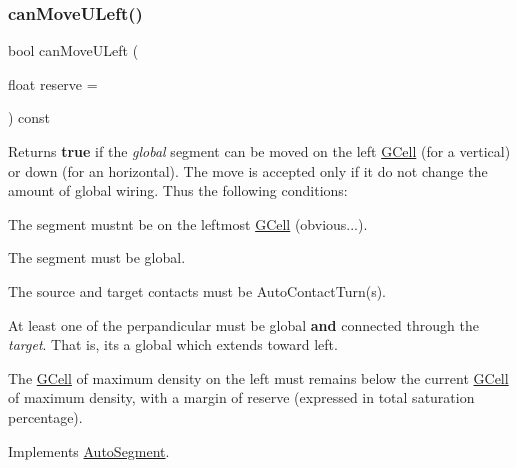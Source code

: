 \mbox{\label{classKatabatic_1_1AutoVertical_a9b0c21eeb26c256876592ba63438da74}} 
\subsubsection{\texorpdfstring{can\+Move\+U\+Left()}{canMoveULeft()}}
{\footnotesize\ttfamily bool can\+Move\+U\+Left (\begin{DoxyParamCaption}\item[{float}]{reserve = {} }\end{DoxyParamCaption}) const\hspace{0.3cm}{\ttfamily [virtual]}}

\begin{DoxyReturn}{Returns}
{\bfseries true} if the {\itshape global} segment can be moved on the left \hyperlink{classKatabatic_1_1GCell}{G\+Cell} (for a vertical) or down (for an horizontal). The move is accepted only if it do not change the amount of global wiring. Thus the following conditions\+:
\begin{DoxyItemize}
\item The segment mustn\textquotesingle{}t be on the leftmost \hyperlink{classKatabatic_1_1GCell}{G\+Cell} (obvious...).
\item The segment must be global.
\item The source and target contacts must be Auto\+Contact\+Turn(s).
\item At least one of the perpandicular must be global {\bfseries and} connected through the {\itshape target}. That is, it\textquotesingle{}s a global which extends toward left.
\item The \hyperlink{classKatabatic_1_1GCell}{G\+Cell} of maximum density on the left must remains below the current \hyperlink{classKatabatic_1_1GCell}{G\+Cell} of maximum density, with a margin of {\ttfamily reserve} (expressed in total saturation percentage). 
\end{DoxyItemize}
\end{DoxyReturn}


Implements \hyperlink{classKatabatic_1_1AutoSegment_aad55626c9d793a0b08bcff5be2a5ad0c}{Auto\+Segment}.



